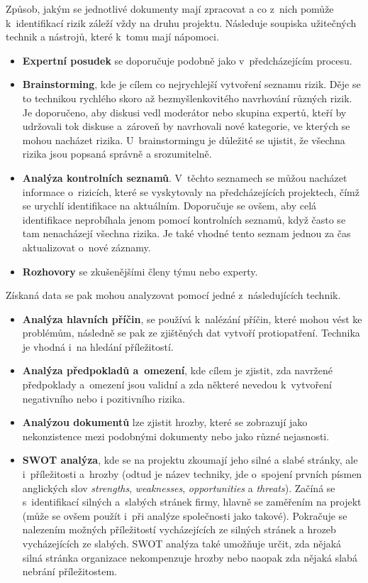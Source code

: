 Způsob, jakým se jednotlivé dokumenty mají zpracovat a co z~nich pomůže k~identifikací rizik záleží vždy na druhu projektu. Následuje soupiska užitečných technik a nástrojů, které k~tomu mají nápomoci.
\begin{itemize}
    \item \textbf{Expertní posudek} se doporučuje podobně jako v~předcházejícím procesu. 
    \item \textbf{Brainstorming}, kde je cílem co nejrychlejší vytvoření seznamu rizik. Děje se to technikou rychlého skoro až bezmyšlenkovitého navrhování různých rizik. Je doporučeno, aby diskusi vedl moderátor nebo skupina expertů, kteří by udržovali tok diskuse a~zároveň by navrhovali nové kategorie, ve kterých se mohou nacházet rizika. U~brainstormingu je důležité se ujistit, že všechna rizika jsou popsaná správně a srozumitelně.
    \item \textbf{Analýza kontrolních seznamů}. V~těchto seznamech se můžou nacházet informace o~rizicích, které se vyskytovaly na předcházejících projektech, čímž se urychlí identifikace na aktuálním. Doporučuje se ovšem, aby celá identifikace neprobíhala jenom pomocí kontrolních seznamů, když často se tam nenacházejí všechna rizika. Je také vhodné tento seznam jednou za čas aktualizovat o~nové záznamy.
    \item \textbf{Rozhovory} se zkušenějšími členy týmu nebo experty. 
\end{itemize}
 
 Získaná data se pak mohou analyzovat pomocí jedné z~následujících technik.
 
 \begin{itemize}
     \item \textbf{Analýza hlavních příčin}, se používá k~nalézání příčin, které mohou vést ke problémům, následně se pak ze zjištěných dat vytvoří protiopatření. Technika je vhodná i~na hledání příležitostí.
     \item \textbf{Analýza předpokladů a~omezení}, kde cílem je zjistit, zda navržené předpoklady a~omezení jsou validní a zda některé nevedou k~vytvoření negativního nebo i pozitivního rizika.
     \item \textbf{Analýzou dokumentů} lze zjistit hrozby, které se zobrazují jako nekonzistence mezi podobnými dokumenty nebo jako různé nejasnosti. 
     \item \textbf{SWOT analýza}, kde se na projektu zkoumají jeho silné a slabé stránky, ale i~příležitosti a~hrozby (odtud je název techniky, jde o~spojení prvních písmen anglických slov \textit{strengths}, \textit{weaknesses}, \textit{opportunities} a \textit{threats}). Začíná se s~identifikací silných a~slabých stránek firmy, hlavně se zaměřením na projekt (může se ovšem použít i~při analýze společnosti jako takové). Pokračuje se nalezením možných příležitostí vycházejících ze silných stránek a hrozeb vycházejících ze slabých. SWOT analýza také umožňuje určit, zda nějaká silná stránka organizace nekompenzuje hrozby nebo naopak zda nějaká slabá nebrání příležitostem.
 \end{itemize}
 
